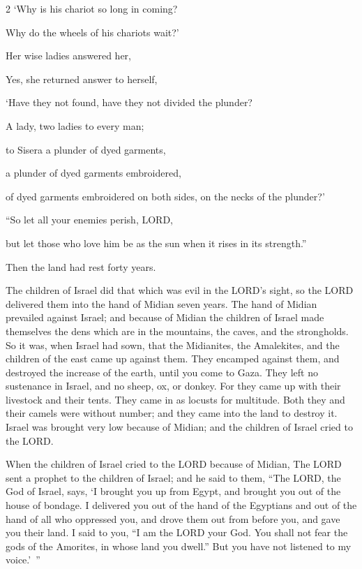 \begin{multicols}{2}
‘Why is his chariot so long in coming?

Why do the wheels of his chariots wait?’

\myverse{}Her wise ladies answered her,

Yes, she returned answer to herself,

\myverse{}‘Have they not found, have they not divided the plunder?

A lady, two ladies to every man;

to Sisera a plunder of dyed garments,

a plunder of dyed garments embroidered,

of dyed garments embroidered on both sides, on the necks of the plunder?’


\vspace{\baselineskip} \myverse{}“So let all your enemies perish, LORD,

but let those who love him be as the sun when it rises in its strength.”

\vspace{\baselineskip} 
Then the land had rest forty years.
\end{multicols}

\mychapter{} \myverse*{}The children of Israel did that which was evil in the LORD’s sight,
so the LORD delivered them into the hand of Midian seven years.
\myverse{}The hand of Midian prevailed against Israel; and because of Midian the children
of Israel made themselves the dens which are in the mountains, the caves, and the strongholds.
\myverse{}So it was, when Israel had sown, that the Midianites, the Amalekites, and the
children of the east came up against them.
\myverse{}They encamped against them, and destroyed the increase of the earth, until you
come to Gaza. They left no sustenance in Israel, and no sheep, ox, or donkey.
\myverse{}For they came up with their livestock and their tents. They came in as locusts
for multitude. Both they and their camels were without number; and they came into the land to destroy
it.
\myverse{}Israel was brought very low because of Midian; and the children of Israel cried
to the LORD.

\myverse{}When the children of Israel cried to the LORD because of Midian,
\myverse{}The LORD sent a prophet to the children of Israel; and he said to them, “The
LORD, the God of Israel, says, ‘I brought you up from Egypt, and brought you out of the house of bondage.
\myverse{}I delivered you out of the hand of the Egyptians and out of the hand of all
who oppressed you, and drove them out from before you, and gave you their land.
\myverse{}I said to you, “I am the LORD your God. You shall not fear the gods of the
Amorites, in whose land you dwell.” But you have not listened to my voice.’ ”

